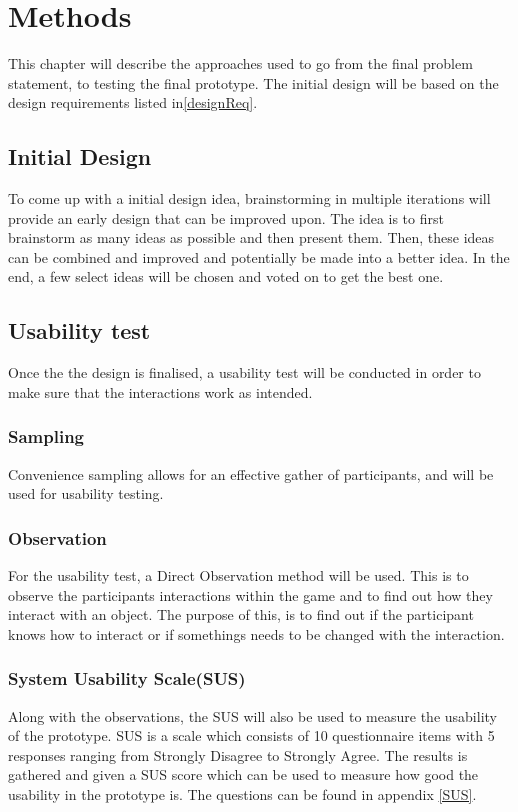 \chapter{Methods}\label{chap:methods}
    This chapter will describe the approaches used to go from the final problem statement, to testing the final prototype. The initial design will be based on the design requirements listed in\autoref{designReq}.
    
    \section{Initial Design}
    To come up with a initial design idea, brainstorming in multiple iterations will provide an early design that can be improved upon. The idea is to first brainstorm as many ideas as possible and then present them. Then, these ideas can be combined and improved and potentially be made into a better idea. In the end, a few select ideas will be chosen and voted on to get the best one.

    \section{Usability test}
    Once the the design is finalised, a usability test will be conducted in order to make sure that the interactions work as intended.
    
    \subsection{Sampling}
    Convenience sampling allows for an effective gather of participants, and will be used for usability testing\cite{bjoernerBog}.   
    
    \subsection{Observation}
    For the usability test, a Direct Observation method will be used\cite{bjoernerBog}. This is to observe the participants interactions within the game and to find out how they interact with an object. The purpose of this, is to find out if the participant knows how to interact or if somethings needs to be changed with the interaction.
    
    \subsection{System Usability Scale(SUS)}
    Along with the observations, the SUS will also be used to measure the usability of the prototype. SUS is a scale which consists of 10 questionnaire items with 5 responses ranging from Strongly Disagree to Strongly Agree. The results is gathered and given a SUS score which can be used to measure how good the usability in the prototype is\cite{SUS}. The questions can be found in appendix \ref{SUS}.
    

